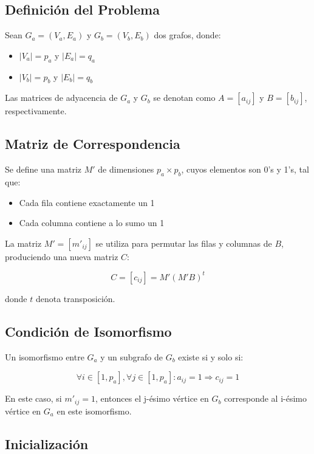 \documentclass[12pt,a4paper]{article}
\begin{document}
\subsection{Definición del Problema}

Sean \(G_a = (V_a, E_a)\) y \(G_b = (V_b, E_b)\) dos grafos, donde:

\begin{itemize}
    \item \(|V_a| = p_a\) y \(|E_a| = q_a\)
    \item \(|V_b| = p_b\) y \(|E_b| = q_b\)
\end{itemize}

Las matrices de adyacencia de \(G_a\) y \(G_b\) se denotan como \(A = [a_{ij}]\) y \(B = [b_{ij}]\), respectivamente.

\subsection{Matriz de Correspondencia}

Se define una matriz \(M'\) de dimensiones \(p_a \times p_b\), cuyos elementos son 0's y 1's, tal que:

\begin{itemize}
    \item Cada fila contiene exactamente un 1
    \item Cada columna contiene a lo sumo un 1
\end{itemize}

La matriz \(M' = [m'_{ij}]\) se utiliza para permutar las filas y columnas de \(B\), produciendo una nueva matriz \(C\):

\[C = [c_{ij}] = M'(M'B)^t\]

donde \(t\) denota transposición.

\subsection{Condición de Isomorfismo}

Un isomorfismo entre \(G_a\) y un subgrafo de \(G_b\) existe si y solo si:

\[\forall i \in [1, p_a], \forall j \in [1, p_a]: a_{ij} = 1 \Rightarrow c_{ij} = 1\]

En este caso, si \(m'_{ij} = 1\), entonces el j-ésimo vértice en \(G_b\) corresponde al i-ésimo vértice en \(G_a\) en este isomorfismo.

\subsection{Inicialización}
\end{document}
